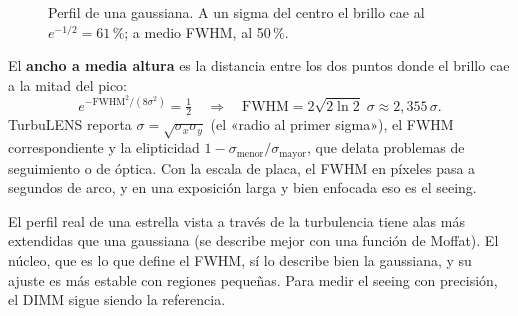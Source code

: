 \begin{figure}[H]
\centering
{}
\caption{Perfil de una gaussiana. A un sigma del centro el brillo cae al $e^{-1/2} = 61\,\%$; a medio FWHM, al 50\,\%.}
\end{figure}

El \textbf{ancho a media altura} es la distancia entre los dos puntos donde el brillo cae a la mitad del pico:
\begin{equation}
e^{-\text{FWHM}^2/(8\sigma^2)} = \tfrac12 \quad\Longrightarrow\quad \text{FWHM} = 2\sqrt{2\ln 2}\;\sigma \approx 2{,}355\,\sigma .
\end{equation}
TurbuLENS reporta $\sigma = \sqrt{\sigma_x\sigma_y}$ (el «radio al primer sigma»), el FWHM correspondiente y la
elipticidad $1 - \sigma_\text{menor}/\sigma_\text{mayor}$, que delata problemas de seguimiento o de óptica. Con la escala
de placa, el FWHM en píxeles pasa a segundos de arco, y en una exposición larga y bien enfocada eso es el seeing.

\begin{nota}
El perfil real de una estrella vista a través de la turbulencia tiene alas más extendidas que una gaussiana (se describe
mejor con una función de Moffat). El núcleo, que es lo que define el FWHM, sí lo describe bien la gaussiana, y su ajuste
es más estable con regiones pequeñas. Para medir el seeing con precisión, el DIMM sigue siendo la referencia.
\end{nota}

